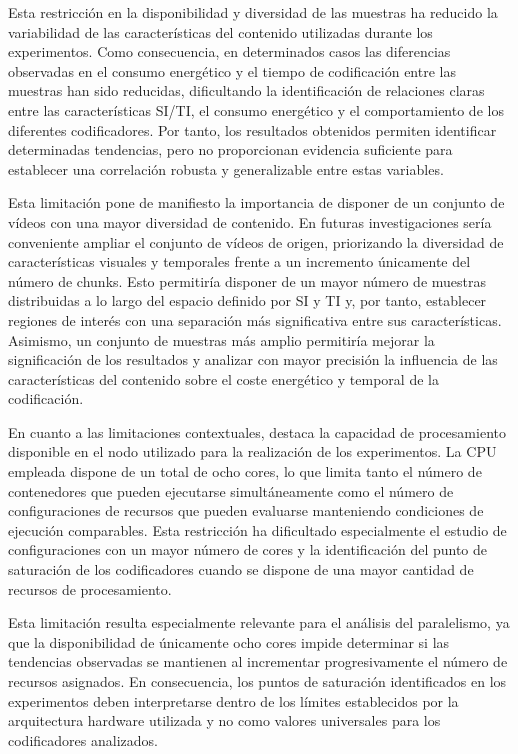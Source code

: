 Esta restricción en la disponibilidad y diversidad de las muestras ha reducido la variabilidad de las características del contenido utilizadas durante los experimentos. Como consecuencia, en determinados casos las diferencias observadas en el consumo energético y el tiempo de codificación entre las muestras han sido reducidas, dificultando la identificación de relaciones claras entre las características SI/TI, el consumo energético y el comportamiento de los diferentes codificadores. Por tanto, los resultados obtenidos permiten identificar determinadas tendencias, pero no proporcionan evidencia suficiente para establecer una correlación robusta y generalizable entre estas variables.

Esta limitación pone de manifiesto la importancia de disponer de un conjunto de vídeos con una mayor diversidad de contenido. En futuras investigaciones sería conveniente ampliar el conjunto de vídeos de origen, priorizando la diversidad de características visuales y temporales frente a un incremento únicamente del número de chunks. Esto permitiría disponer de un mayor número de muestras distribuidas a lo largo del espacio definido por SI y TI y, por tanto, establecer regiones de interés con una separación más significativa entre sus características. Asimismo, un conjunto de muestras más amplio permitiría mejorar la significación de los resultados y analizar con mayor precisión la influencia de las características del contenido sobre el coste energético y temporal de la codificación.

En cuanto a las limitaciones contextuales, destaca la capacidad de procesamiento disponible en el nodo utilizado para la realización de los experimentos. La CPU empleada dispone de un total de ocho cores, lo que limita tanto el número de contenedores que pueden ejecutarse simultáneamente como el número de configuraciones de recursos que pueden evaluarse manteniendo condiciones de ejecución comparables. Esta restricción ha dificultado especialmente el estudio de configuraciones con un mayor número de cores y la identificación del punto de saturación de los codificadores cuando se dispone de una mayor cantidad de recursos de procesamiento.

Esta limitación resulta especialmente relevante para el análisis del paralelismo, ya que la disponibilidad de únicamente ocho cores impide determinar si las tendencias observadas se mantienen al incrementar progresivamente el número de recursos asignados. En consecuencia, los puntos de saturación identificados en los experimentos deben interpretarse dentro de los límites establecidos por la arquitectura hardware utilizada y no como valores universales para los codificadores analizados.

